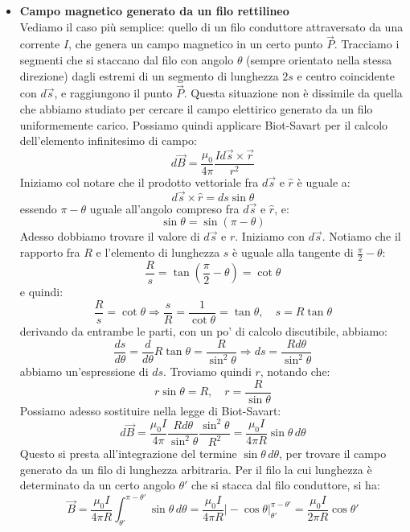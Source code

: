\documentclass[a4paper,12pt]{article}
\begin{document}
\begin{itemize}
  \item \textbf{Campo magnetico generato da un filo rettilineo} \\
    Vediamo il caso più semplice: quello di un filo conduttore attraversato da una corrente $I$, che genera un campo magnetico in un certo punto $\vec{P}$.
    Tracciamo i segmenti che si staccano dal filo con angolo $\theta$ (sempre orientato nella stessa direzione) dagli estremi di un segmento di lunghezza $2s$ e centro coincidente
    con $d\vec{s}$, e raggiungono il punto $\vec{P}$. Questa situazione non è dissimile da quella che abbiamo studiato per cercare il campo elettirico generato da un filo uniformemente
    carico. Possiamo quindi applicare Biot-Savart per il calcolo dell'elemento infinitesimo di campo:
    $$ d\vec{B} = \frac{\mu_0}{4\pi} \frac{Id\vec{s} \times \vec{r}}{r^2} $$
    Iniziamo col notare che il prodotto vettoriale fra $d\vec{s}$ e $\hat{r}$ è uguale a:
    $$ d\vec{s} \times \hat{r} = ds \sin{\theta} $$
    essendo $\pi - \theta$ uguale all'angolo compreso fra $d\vec{s}$ e $\hat{r}$, e:
    $$ \sin{\theta} = \sin{(\pi - \theta)} $$
    Adesso dobbiamo trovare il valore di $d\vec{s}$ e $r$.
    Iniziamo con $d\vec{s}$. Notiamo che il rapporto fra $R$ e l'elemento di lunghezza $s$ è uguale alla tangente di $\frac{\pi}{2} - \theta$:
    $$ \frac{R}{s} = \tan{\left(\frac{\pi}{2} - \theta\right)} = \cot{\theta} $$
    e quindi:
    $$ \frac{R}{s} = \cot{\theta} \Rightarrow \frac{s}{R} = \frac{1}{\cot{\theta}} = \tan{\theta}, \quad s = R\tan{\theta} $$
    derivando da entrambe le parti, con un po' di calcolo discutibile, abbiamo:
    $$ \frac{ds}{d\theta} = \frac{d}{d\theta} R\tan{\theta} = \frac{R}{\sin^2{\theta}} \Rightarrow ds = \frac{Rd\theta}{\sin^2{\theta}} $$
    abbiamo un'espressione di $ds$. Troviamo quindi $r$, notando che:
    $$ r\sin{\theta} = R, \quad r = \frac{R}{\sin{\theta}} $$
    Possiamo adesso sostituire nella legge di Biot-Savart:
    $$ d\vec{B} = \frac{\mu_0I}{4\pi} \frac{Rd\theta}{\sin^2{\theta}} \frac{\sin^2{\theta}}{R^2} = \frac{\mu_0 I}{4\pi R} \sin{\theta} \, d\theta $$
    Questo si presta all'integrazione del termine $\sin{\theta}\,d\theta$, per trovare il campo generato da un filo di lunghezza arbitraria. Per il filo
    la cui lunghezza è determinato da un certo angolo $\theta'$ che si stacca dal filo conduttore, si ha:
    $$ \vec{B} =  \frac{\mu_0 I}{4\pi R} \int_{\theta'}^{\pi - \theta'} \sin{\theta} \, d\theta =  \frac{\mu_0 I}{4\pi R} \Big| -\cos{\theta} \Big|^{\pi - \theta'}_{\theta'}  =  \frac{\mu_0 I}{2\pi R}\cos{\theta'} $$

\end{itemize}
\end{document}
